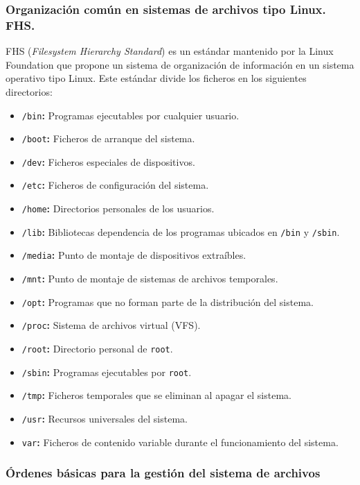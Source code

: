 \subsubsection{Organización común en sistemas de archivos tipo Linux. FHS.}

FHS (\emph{Filesystem Hierarchy Standard}) es un estándar mantenido por la Linux Foundation que propone un sistema de organización de información en un sistema operativo tipo Linux.
Este estándar divide los ficheros en los siguientes directorios:

\begin{itemize}
	\item\texttt{/bin}\textbf{:} Programas ejecutables por cualquier usuario.
	\item\texttt{/boot}\textbf{:} Ficheros de arranque del sistema.
	\item\texttt{/dev}\textbf{:} Ficheros especiales de dispositivos.
	\item\texttt{/etc}\textbf{:} Ficheros de configuración del sistema.
	\item\texttt{/home}\textbf{:} Directorios personales de los usuarios.
	\item\texttt{/lib}\textbf{:} Bibliotecas dependencia de los programas ubicados en \texttt{/bin} y \texttt{/sbin}.
	\item\texttt{/media}\textbf{:} Punto de montaje de dispositivos extraíbles.
	\item\texttt{/mnt}\textbf{:} Punto de montaje de sistemas de archivos temporales.
	\item\texttt{/opt}\textbf{:} Programas que no forman parte de la distribución del sistema.
	\item\texttt{/proc}\textbf{:} Sistema de archivos virtual (VFS).
	\item\texttt{/root}\textbf{:} Directorio personal de \texttt{root}.
	\item\texttt{/sbin}\textbf{:} Programas ejecutables por \texttt{root}.
	\item\texttt{/tmp}\textbf{:} Ficheros temporales que se eliminan al apagar el sistema.
	\item\texttt{/usr}\textbf{:} Recursos universales del sistema.
	\item\texttt{var}\textbf{:} Ficheros de contenido variable durante el funcionamiento del sistema.
\end{itemize}

\subsubsection{Órdenes básicas para la gestión del sistema de archivos}


